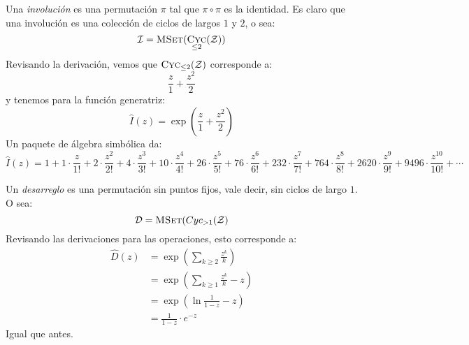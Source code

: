 \documentclass[english, spanish, fleqn, 10pt]{article}
\numberwithin{equation}{section}
\theoremstyle{definition}
\DeclareMathOperator{\Cyc}{\textsc{Cyc}}
\DeclareMathOperator{\MSet}{\textsc{MSet}}
\begin{document}
	Una \emph{involución} es una permutación \(\pi\)
	tal que \(\pi \circ \pi\) es la identidad.
	Es claro que una involución
	es una colección de ciclos de largos \(1\) y \(2\),
	o sea:
	\begin{equation*}
	\mathcal{I}
	= \MSet(\Cyc_{\le 2}(\mathcal{Z}))
	\end{equation*}
	Revisando la derivación,
	vemos que \(\Cyc_{\le 2}(\mathcal{Z})\) corresponde a:
	\begin{equation*}
	\frac{z}{1} + \frac{z^2}{2}
	\end{equation*}
	y tenemos para la función generatriz:
	\begin{equation*}
	\widehat{I}(z)
	= \exp\left( \frac{z}{1} + \frac{z^2}{2} \right)
	\end{equation*}
	Un paquete de álgebra simbólica da:
	\begin{equation*}
	\widehat{I}(z)
	= 1 +    1 \cdot \frac{z}{1!}
	+    2 \cdot \frac{z^2}{2!}
	+    4 \cdot \frac{z^3}{3!}
	+   10 \cdot \frac{z^4}{4!}
	+   26 \cdot \frac{z^5}{5!}
	+   76 \cdot \frac{z^6}{6!}
	+  232 \cdot \frac{z^7}{7!}
	+  764 \cdot \frac{z^8}{8!}
	+ 2620 \cdot \frac{z^9}{9!}
	+ 9496 \cdot \frac{z^{10}}{10!}
	+ \dotsm
	\end{equation*}
	
	Un \emph{desarreglo} es una permutación sin puntos fijos,
	vale decir,
	sin ciclos de largo \(1\).
	O sea:
	\begin{equation*}
	\mathcal{D}
	= \MSet(Cyc_{> 1}(\mathcal{Z})
	\end{equation*}
	Revisando las derivaciones para las operaciones,
	esto corresponde a:
	\begin{align*}
	\widehat{D}(z)
	&= \exp \left( \sum_{k \ge 2} \frac{z^k}{k} \right) \\
	&= \exp \left( \sum_{k \ge 1} \frac{z^k}{k} - z \right) \\
	&= \exp \left( \ln \frac{1}{1 - z} - z \right) \\
	&= \frac{1}{1 - z} \cdot e^{-z}
	\end{align*}
	Igual que antes.
	

\end{document}
